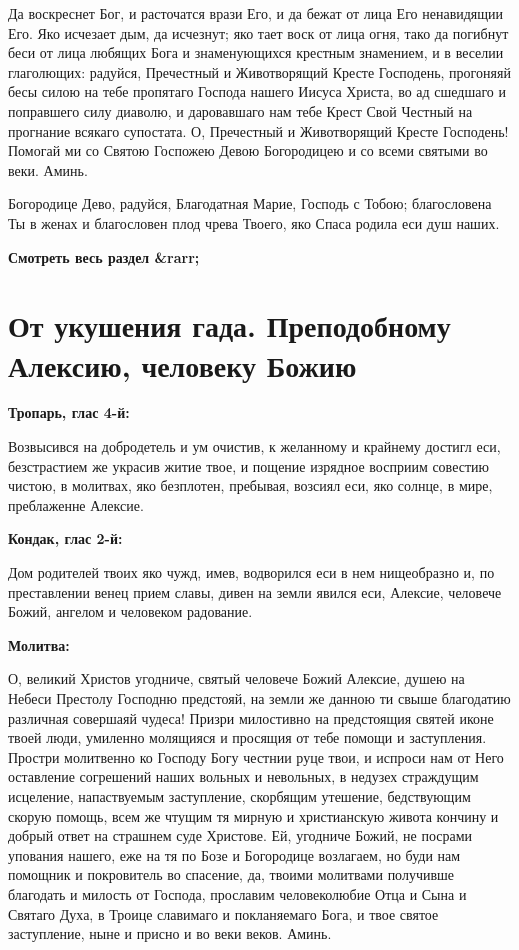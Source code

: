 Да воскреснет Бог, и расточатся врази Его, и да бежат от лица Его ненавидящии Его. Яко исчезает дым, да исчезнут; яко тает воск от лица огня, тако да погибнут беси от лица любящих Бога и знаменующихся крестным знамением, и в веселии глаголющих: радуйся, Пречестный и Животворящий Кресте Господень, прогоняяй бесы силою на тебе пропятаго Господа нашего Иисуса Христа, во ад сшедшаго и поправшего силу диаволю, и даровавшаго нам тебе Крест Свой Честный на прогнание всякаго супостата. О, Пречестный и Животворящий Кресте Господень! Помогай ми со Святою Госпожею Девою Богородицею и со всеми святыми во веки. Аминь.


Богородице Дево, радуйся, Благодатная Марие, Господь с Тобою; благословена Ты в женах и благословен плод чрева Твоего, яко Спаса родила еси душ наших.


\mychapterending


\bfseries Смотреть весь раздел &rarr;\normalfont{} 

\section{От укушения гада.  Преподобному Алексию, человеку Божию}
 


\bfseries Тропарь, глас 4-й:\normalfont{}


Возвысився на добродетель и ум очистив, к желанному и крайнему достигл еси, безстрастием же украсив житие твое, и пощение изрядное восприим совестию чистою, в молитвах, яко безплотен, пребывая, возсиял еси, яко солнце, в мире, преблаженне Алексие.


\medskip


\bfseries Кондак, глас 2-й:\normalfont{}


Дом родителей твоих яко чужд, имев, водворился еси в нем нищеобразно и, по преставлении венец прием славы, дивен на земли явился еси, Алексие, человече Божий, ангелом и человеком радование.


\medskip


\bfseries Молитва:\normalfont{}


О, великий Христов угодниче, святый человече Божий Алексие, душею на Небеси Престолу Господню предстояй, на земли же данною ти свыше благодатию различная совершаяй чудеса! Призри милостивно на предстоящия святей иконе твоей люди, умиленно молящияся и просящия от тебе помощи и заступления. Простри молитвенно ко Господу Богу честнии руце твои, и испроси нам от Него оставление согрешений наших вольных и невольных, в недузех страждущим исцеление, напаствуемым заступление, скорбящим утешение, бедствующим скорую помощь, всем же чтущим тя мирную и христианскую живота кончину и добрый ответ на страшнем суде Христове. Ей, угодниче Божий, не посрами упования нашего, еже на тя по Бозе и Богородице возлагаем, но буди нам помощник и покровитель во спасение, да, твоими молитвами получивше благодать и милость от Господа, прославим человеколюбие Отца и Сына и Святаго Духа, в Троице славимаго и покланяемаго Бога, и твое святое заступление, ныне и присно и во веки веков. Аминь.


